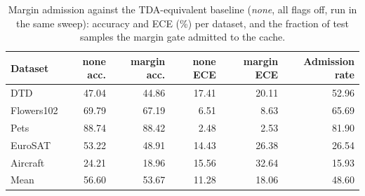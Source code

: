 \begin{table}[htbp]
\centering
\begin{tabular}{lrrrrr}
\toprule
Dataset & none acc. & margin acc. & none ECE & margin ECE & Admission rate \\
\midrule
DTD & 47.04 & 44.86 & 17.41 & 20.11 & 52.96 \\
Flowers102 & 69.79 & 67.19 & 6.51 & 8.63 & 65.69 \\
Pets & 88.74 & 88.42 & 2.48 & 2.53 & 81.90 \\
EuroSAT & 53.22 & 48.91 & 14.43 & 26.38 & 26.54 \\
Aircraft & 24.21 & 18.96 & 15.56 & 32.64 & 15.93 \\
Mean & 56.60 & 53.67 & 11.28 & 18.06 & 48.60 \\
\bottomrule
\end{tabular}
\caption{Margin admission against the TDA-equivalent baseline (\emph{none}, all flags off, run in the same sweep): accuracy and ECE (\%) per dataset, and the fraction of test samples the margin gate admitted to the cache.}
\label{tab:margin}
\end{table}
